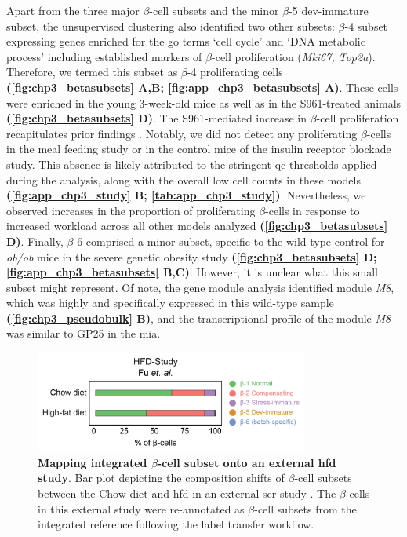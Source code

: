 \par Apart from the three major $\beta$-cell subsets and the minor $\beta$-5 dev-immature subset, the unsupervised clustering also identified two other subsets: $\beta$-4 subset expressing genes enriched for the \gls{go} terms `cell cycle’ and `DNA metabolic process’ including established markers of $\beta$-cell proliferation (\textit{Mki67, Top2a}). Therefore, we termed this subset as $\beta$-4 proliferating cells \textbf{(\autoref{fig:chp3_betasubsets} A,B; \autoref{fig:app_chp3_betasubsets} A)}. These cells were enriched in the young 3-week-old mice as well as in the S961-treated animals \textbf{(\autoref{fig:chp3_betasubsets} D)}. The S961-mediated increase in $\beta$-cell proliferation recapitulates prior findings \textbf{\cite{shirakawa_signaling_2023,wortham_metabolic_2024}}. Notably, we did not detect any proliferating $\beta$-cells in the meal feeding study or in the control mice of the insulin receptor blockade study. This absence is likely attributed to the stringent \gls{qc} thresholds applied during the analysis, along with the overall low cell counts in these models \textbf{(\autoref{fig:app_chp3_study} B; \autoref{tab:app_chp3_study})}. Nevertheless, we observed increases in the proportion of proliferating $\beta$-cells in response to increased workload across all other models analyzed \textbf{(\autoref{fig:chp3_betasubsets} D)}. Finally, $\beta$-6 comprised a minor subset, specific to the wild-type control for \textit{ob/ob} mice in the severe genetic obesity study \textbf{(\autoref{fig:chp3_betasubsets} D; \autoref{fig:app_chp3_betasubsets} B,C)}. However, it is unclear what this small subset might represent. Of note, the gene module analysis identified module \textit{M8}, which was highly and specifically expressed in this wild-type sample \textbf{(\autoref{fig:chp3_pseudobulk} B)}, and the transcriptional profile of the module \textit{M8} was similar to GP25 in the \gls{mia}.\\

\begin{figure}
\vspace{-15pt}
\includegraphics[width=9cm]{Chapter5/Fig/F3-1-v2-04.png}
\caption[Mapping integrated $\beta$-cell subset onto an external  study]{\textbf{Mapping integrated $\beta$-cell subset onto an external \gls{hfd} study}. Bar plot depicting the composition shifts of $\beta$-cell subsets between the Chow diet and \gls{hfd} in an external \gls{scr} study \textbf{\cite{fu_single-cell_2023}}. The $\beta$-cells in this external study were re-annotated as $\beta$-cell subsets from the integrated reference following the label transfer workflow.}
\vspace{-8pt}
\label{fig:chp3_hfdmapping}
\end{figure}


